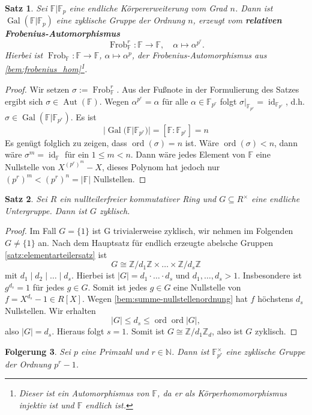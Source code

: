 \documentclass[a4paper, twoside, 11pt, ngerman]{report}
\newcommand{\FF}{\mathds F}
\newcommand{\NN}{\mathds N}
\newcommand{\ZZ}{\mathds Z}
\DeclareMathOperator{\Aut}{Aut}
\DeclareMathOperator{\Frob}{Frob}
\DeclareMathOperator{\Gal}{Gal}
\DeclareMathOperator{\ident}{id}
\DeclareMathOperator{\ord}{ord}
\theoremstyle{definistyle}
\newtheorem{satz}{Satz}[section]
\newtheorem{folgerung}[satz]{Folgerung}
\theoremstyle{remark}
\newcommand{\defn}[1]{\textit{\bfseries #1}}
\begin{document}
\begin{satz}\label{satz:galoisgr_endl_kp}
Sei $\FF|\FF_p$ eine endliche Körpererweiterung vom Grad $n$.  
Dann ist $\Gal(\FF|\FF_p)$ eine zyklische Gruppe der Ordnung $n$, erzeugt vom \defn{relativen Frobenius-Automorphismus}
\[
\Frob_\FF^r \colon \FF \to \FF, \quad \alpha \mapsto \alpha^{p^r}.
\]
Hierbei ist $\Frob_\FF\colon \FF \to \FF$, $\alpha \mapsto \alpha^p$, der Frobenius-Automorphismus aus \ref{bem:frobenius_hom}\footnote{Dieser ist ein Automorphismus von $\FF$, da er als Körperhomomorphismus injektiv ist und $\FF$ endlich ist.}.
\end{satz}
\begin{proof}
Wir setzen $\sigma:=\Frob_\FF^r$. Aus der Fußnote in der Formulierung des Satzes ergibt sich $\sigma \in \Aut(\FF)$. 
Wegen $\alpha^{p^r} = \alpha$ für alle $\alpha \in \FF_{p^r}$ folgt $\sigma|_{\FF_{p^r}} = \ident_{\FF_{p^r}}$, d.h. $\sigma \in \Gal(\FF|\FF_{p^r})$. Es ist
\[
|\Gal(\FF|\FF_{p^r})|=[\FF:\FF_{p^r}]=n
\]
Es genügt folglich zu zeigen, dass $\ord(\sigma)=n$ ist. 
Wäre $\ord(\sigma)<n$, dann wäre $\sigma^m=\ident_\FF$ für ein $1\leq m<n$. Dann wäre jedes Element von $\FF$
eine Nullstelle von $X^{(p^r)^m}-X$, dieses Polynom hat jedoch nur $(p^r)^m<(p^r)^n=|\FF|$ Nullstellen.
\end{proof}

\begin{satz}\label{satz:endl_ug_einhgr_zykl}
Sei $R$ ein nullteilerfreier kommutativer Ring und $G \subseteq R^\times$ eine endliche Untergruppe.  
Dann ist $G$ zyklisch.
\end{satz}

\begin{proof}
Im Fall $G=\{1\}$ ist G trivialerweise zyklisch, wir nehmen im Folgenden $G\neq\{1\}$ an.   
Nach dem Hauptsatz für endlich erzeugte abelsche Gruppen \ref{satz:elementarteilersatz} ist 
\[
G \cong \ZZ/{d_1}\ZZ \times \ldots \times \ZZ/{d_s}\ZZ
\]
mit $d_1 \mid d_2\mid\ldots\mid d_s$. Hierbei ist $|G| = d_1 \cdot\ldots\cdot d_s$ und $d_1, \ldots, d_s > 1$.  
Insbesondere ist $g^{d_s}=1$ für jedes $g\in G$. Somit ist jedes $g \in G$ eine Nullstelle von $f = X^{d_s} - 1 \in R[X]$.
Wegen \ref{bem:summe-nullstellenordnung} hat $f$ höchstens $d_s$ Nullstellen. Wir erhalten
\[  
|G| \leq d_s \leq \ord \ord|G|,
\]
also $|G|=d_s$. Hieraus folgt $s=1$. Somit ist $G \cong \ZZ/d_1\ZZ_d$, also ist $G$ zyklisch.
\end{proof}

\begin{folgerung}\label{folgerung:endl_kp_einh_zyklisch}
Sei $p$ eine Primzahl und $r \in \NN$. Dann ist $\FF_{p^r}^\times$ eine zyklische Gruppe der Ordnung $p^r - 1$.
\end{folgerung}
\end{document}
